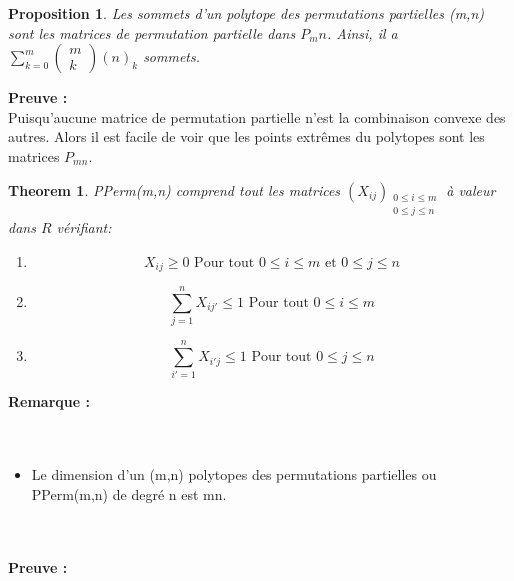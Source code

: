 \documentclass{book}
\newtheorem{theorem}{Theorem}[section]
\newtheorem{petit_nom1}{Proposition}
\begin{document}
 
 
  \begin{petit_nom1} 
  Les sommets d'un polytope des permutations partielles (m,n) sont les matrices de permutation partielle dans $P_mn$. Ainsi, il a $\sum_{k=0}^{m}{
\begin{pmatrix}
 m\\k
 \end{pmatrix}
 (n)_k
}$ sommets.\\
  \end{petit_nom1} 
\textbf{Preuve :}\\
Puisqu'aucune matrice de permutation partielle n'est la combinaison convexe des autres. Alors il est facile de voir que les points extrêmes du polytopes sont les matrices $P_{mn}$.\\

 \begin{theorem}
 PPerm(m,n) comprend tout les matrices $(X_{ij})_{\substack {0\leqslant i \leqslant m\\0 \leqslant j \leqslant n}}$ à valeur dans $R$ vérifiant: \\
 \begin{enumerate}
 \item \begin{equation}
 X_{ij}   \geq   0  \text{ Pour tout } 0\leqslant i \leqslant m \text{ et } 0 \leqslant j \leqslant n
 \end{equation}
 \item \begin{equation}
 \sum_{j=1}^{n} X_{ij'} \leqslant 1   \text{ Pour tout } 0\leqslant i \leqslant m
 \end{equation}
 \item \begin{equation}
 \sum_{i'=1}^{n} X_{i'j} \leqslant 1   \text{ Pour tout } 0\leqslant j \leqslant n
 \end{equation}
 \end{enumerate} 
 \end{theorem} 
 \textbf{Remarque : \\\\}
\\
\begin{itemize}
\item Le dimension d'un (m,n) polytopes des permutations partielles ou PPerm(m,n) de degré n est mn. \\\\\\
\end{itemize}
\textbf{Preuve :} \\\\
\end{document}
